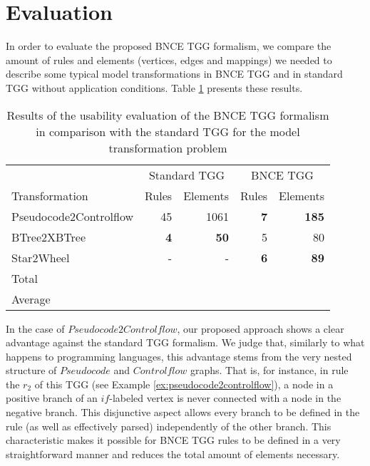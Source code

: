\documentclass[]{report}
\begin{document}
\section{Evaluation}
In order to evaluate the proposed BNCE TGG formalism, we compare the amount of rules and elements (vertices, edges and mappings) we needed to describe some typical model transformations in BNCE TGG and in standard TGG without application conditions. Table \ref{tab:formalism-eval} presents these results.
\begin{table}[h]
	\centering
	\begin{tabular}{l r r r r }
						& \multicolumn{2}{c}{Standard TGG} & \multicolumn{2}{c}{BNCE TGG}\\
		Transformation 			& Rules & Elements 	& Rules & Elements\\
		\hline
		Pseudocode2Controlflow	& 45			& 1061	& \textbf{7}	& \textbf{185} \\
		BTree2XBTree			& \textbf{4}	& \textbf{50}	& 5		& 80 \\
		Star2Wheel				& -				& -		& \textbf{6} 	& \textbf{89} \\
		\hline
		Total					&  & 		&	& \\
		Average					&  & 		&	& \\
	\end{tabular}
	\caption{Results of the usability evaluation of the BNCE TGG formalism in comparison with the standard TGG for the model transformation problem}
	\label{tab:formalism-eval}
\end{table}

In the case of $Pseudocode2Controlflow$, our proposed approach shows a clear advantage against the standard TGG formalism. We judge that, similarly to what happens to programming languages, this advantage stems from the very nested structure of $Pseudocode$ and $Controlflow$ graphs. That is, for instance, in rule the $r_2$ of this TGG (see Example \ref{ex:pseudocode2controlflow}), a node in a positive branch of an $if$-labeled vertex is never connected with a node in the negative branch. This disjunctive aspect allows every branch to be defined in the rule (as well as effectively parsed) independently of the other branch. This characteristic makes it possible for BNCE TGG rules to be defined in a very straightforward manner and reduces the total amount of elements necessary.
\end{document}
